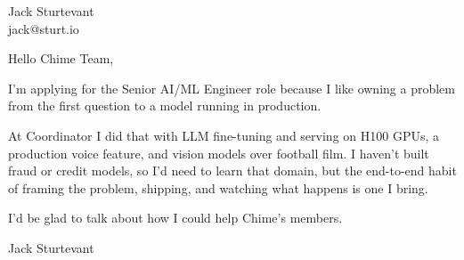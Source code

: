 \documentclass[11pt]{article}
\begin{document}
\raggedright

{\namefont\fontsize{20pt}{24pt}\selectfont Jack Sturtevant}\\[-0.3em]
jack@sturt.io

\vspace{1.2em}

Hello Chime Team,

I'm applying for the Senior AI/ML Engineer role because I like owning a problem from the first question to a model running in production.

At Coordinator I did that with LLM fine-tuning and serving on H100 GPUs, a production voice feature, and vision models over football film. I haven't built fraud or credit models, so I'd need to learn that domain, but the end-to-end habit of framing the problem, shipping, and watching what happens is one I bring.

I'd be glad to talk about how I could help Chime's members.

\vspace{0.6em}
Jack Sturtevant
\end{document}
